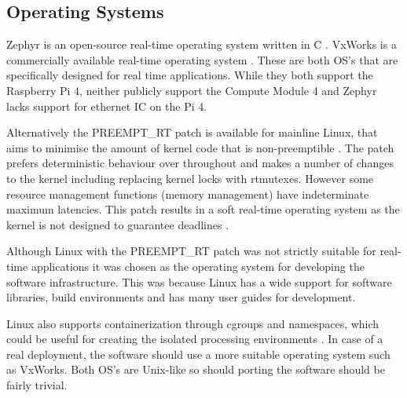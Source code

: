 \graphicspath{{main/design/software/graphics/}}

\subsection{Operating Systems} \label{sec:operatingSystems}



Zephyr is an open-source real-time operating system written in C \autocite{zephyrZephyrprojectrtosZephyr2024}. VxWorks is a commercially available real-time operating system \autocite{hambardeSurveyRealTime2014}. These are both OS's that are specifically designed for real time applications. While they both support the Raspberry Pi 4, neither publicly support the Compute Module 4 and Zephyr lacks support for ethernet IC on the Pi 4.

Alternatively the PREEMPT\_RT patch is available for mainline Linux, that aims to minimise the amount of kernel code that is non-preemptible  \autocite{linuxfoundationRealtimeDocumentationStart}. The patch prefers deterministic behaviour over throughout and makes a number of changes to the kernel including replacing kernel locks with rtmutexes. However some resource management functions (memory management) have indeterminate maximum latencies. This patch results in a soft real-time operating system as the kernel is not designed to guarantee deadlines \autocite{maddenChallengesUsingLinux2019}.

Although Linux with the PREEMPT\_RT patch was not strictly suitable for real-time applications it was chosen as the operating system for developing the software infrastructure. This was because Linux has a wide support for software libraries, build environments and has many user guides for development.

Linux also supports containerization through cgroups and namespaces, which could be useful for creating the isolated processing environments \autocite{huynhKubernetesStoryLinux2023}. In case of a real deployment, the software should use a more suitable operating system such as VxWorks. Both OS's are Unix-like so should porting the software should be fairly trivial.

\clearpage

